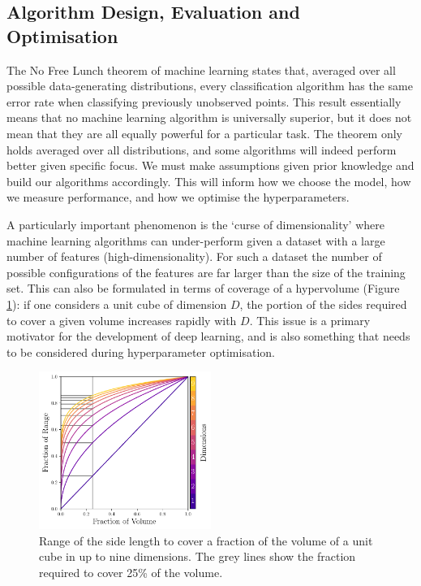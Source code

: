 \subsection{Algorithm Design, Evaluation and Optimisation}

The No Free Lunch theorem of machine learning \cite{NoFreeLunch} states that, averaged over all possible data-generating distributions, every classification algorithm has the same error rate when classifying previously unobserved points.
This result essentially means that no machine learning algorithm is universally superior, but it does not mean that they are all equally powerful for a particular task. 
The theorem only holds averaged over all distributions, and some algorithms will indeed perform better given specific focus. We must make assumptions given prior knowledge and build our algorithms accordingly.
This will inform how we choose the model, how we measure performance, and how we optimise the hyperparameters. 


A particularly important phenomenon is the `curse of dimensionality' \cite{elementsOfStatsLearning} where machine learning algorithms can under-perform given a dataset with a large number of features (high-dimensionality).
For such a dataset the number of possible configurations of the features are far larger than the size of the training set. 
This can also be formulated in terms of coverage of a hypervolume (Figure \ref{fig:machine_learning:curse_of_dimensionality}): if one considers a unit cube of dimension $D$, the portion of the sides required to cover a given volume increases rapidly with $D$.
This issue is a primary motivator for the development of deep learning, and is also something that needs to be considered during hyperparameter optimisation. 
\begin{figure}[h!]
    \begin{center}
        \includegraphics[width=0.5\textwidth]{figures/machine_learning/curse_of_dimensionality.pdf}
    \end{center}
    \caption{Range of the side length to cover a fraction of the volume of a unit cube in up to nine dimensions. The grey lines show the fraction required to cover 25\% of the volume.}
        \label{fig:machine_learning:curse_of_dimensionality}
\end{figure}


